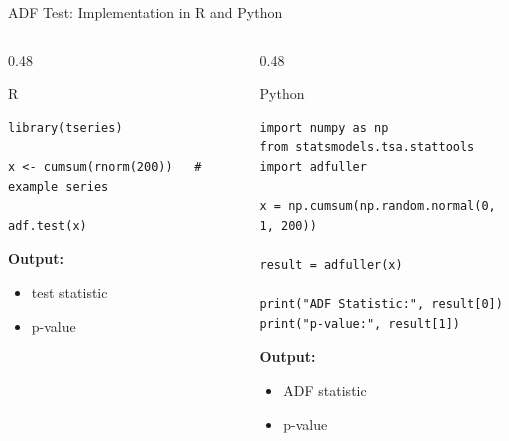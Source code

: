 \documentclass[aspectratio=169]{beamer}
\begin{document}
\begin{frame}[fragile]{ADF Test: Implementation in R and Python}
\small

\begin{columns}[T]
\begin{column}{0.48\textwidth}
\begin{block}{R}
\begin{verbatim}
library(tseries)

x <- cumsum(rnorm(200))   # example series

adf.test(x)
\end{verbatim}

\vspace{0.2cm}
\textbf{Output:}
\begin{itemize}
    \item test statistic
    \item p-value
\end{itemize}
\end{block}
\end{column}

\begin{column}{0.48\textwidth}
\begin{block}{Python}
\begin{verbatim}
import numpy as np
from statsmodels.tsa.stattools import adfuller

x = np.cumsum(np.random.normal(0, 1, 200))

result = adfuller(x)

print("ADF Statistic:", result[0])
print("p-value:", result[1])
\end{verbatim}

\vspace{0.2cm}
\textbf{Output:}
\begin{itemize}
    \item ADF statistic
    \item p-value
\end{itemize}
\end{block}
\end{column}
\end{columns}

\end{frame}
\end{document}
